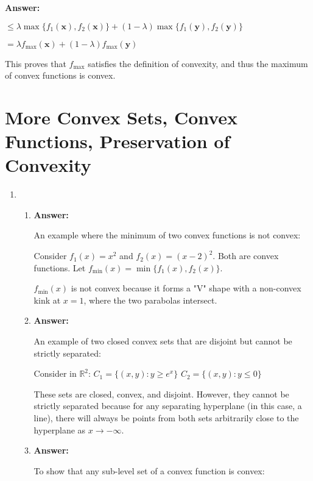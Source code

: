 \documentclass{article}
\newenvironment{answer}
    {\par\noindent\textbf{Answer:}\par}
    {\par}
\begin{document}
\begin{enumerate}
\begin{enumerate}
\begin{answer}
        $\leq \lambda \max\{f_1(\mathbf{x}), f_2(\mathbf{x})\} + (1-\lambda) \max\{f_1(\mathbf{y}), f_2(\mathbf{y})\}$
        
        $= \lambda f_{\max}(\mathbf{x}) + (1-\lambda) f_{\max}(\mathbf{y})$
        
        This proves that $f_{\max}$ satisfies the definition of convexity, and thus the maximum of convex functions is convex.
        \end{answer}
    \end{enumerate}

    \section{More Convex Sets, Convex Functions, Preservation of Convexity}

\begin{enumerate}
    \item 
    \begin{enumerate}
        \item 
        \begin{answer}
        An example where the minimum of two convex functions is not convex:
        
        Consider $f_1(x) = x^2$ and $f_2(x) = (x-2)^2$. Both are convex functions.
        Let $f_{\min}(x) = \min\{f_1(x), f_2(x)\}$.
        
        $f_{\min}(x)$ is not convex because it forms a "V" shape with a non-convex kink at $x=1$, where the two parabolas intersect.
        \end{answer}

        \item 
        \begin{answer}
        An example of two closed convex sets that are disjoint but cannot be strictly separated:
        
        Consider in $\mathbb{R}^2$:
        $C_1 = \{(x,y) : y \geq e^x\}$
        $C_2 = \{(x,y) : y \leq 0\}$
        
        These sets are closed, convex, and disjoint. However, they cannot be strictly separated because for any separating hyperplane (in this case, a line), there will always be points from both sets arbitrarily close to the hyperplane as $x \to -\infty$.
        \end{answer}

        \item 
        \begin{answer}
        To show that any sub-level set of a convex function is convex:
        

\end{answer}
\end{enumerate}
\end{enumerate}
\end{enumerate}
\end{document}
